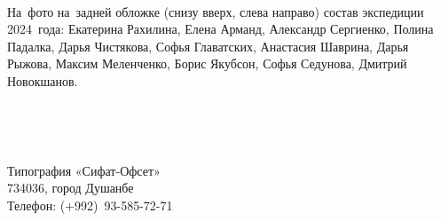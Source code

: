 \clearpage
\thispagestyle{empty}

~\\

\vfill

{\setlength{\parindent}{0cm}
На~фото на~задней обложке (снизу вверх, слева направо) состав экспедиции 2024~года: Екатерина Рахилина, Елена Арманд, Александр Сергиенко, Полина Падалка, Дарья Чистякова, Софья Главатских, Анастасия Шаврина, Дарья Рыжова, Максим Меленченко, Борис Якубсон, Софья Седунова, Дмитрий Новокшанов.
}

\bigskip

~\\

\pagebreak

\clearpage
\thispagestyle{empty}

{\setlength{\parindent}{0cm} 

~\\

\vfill

Типография «Сифат-Офсет»\\
734036, город Душанбе\\
Телефон: (+992)~93-585-72-71
}